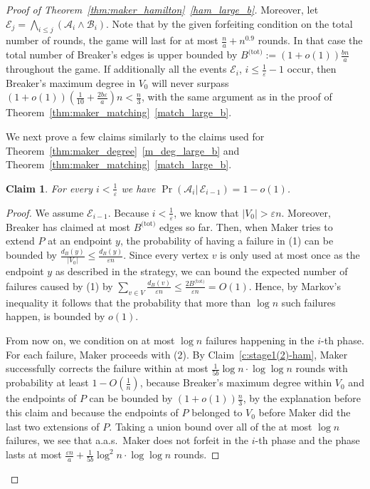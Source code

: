 \documentclass[11pt, a4paper]{article}
\numberwithin{equation}{section}
\numberwithin{figure}{section}
\newtheorem{claim}[theorem]{Claim}
\newcommand{\eps}{\varepsilon}
\begin{document}
\begin{proof}[Proof of Theorem~\ref{thm:maker_hamilton}~\ref{ham_large_b}]
Moreover, let $\mathcal{E}_j = \bigwedge_{i \leq j} (\mathcal{A}_i \land \mathcal{B}_i)$. Note that 
by the given forfeiting condition on the total 
number of rounds, the game will last for at most $\frac{n}{a}+n^{0.9}$ rounds. In that case the total number of Breaker's edges is upper bounded by $B^{\text{(tot)}}:=(1+o(1)) \frac{bn}{a}$ throughout the game.
If additionally all the events $\mathcal{E}_i$, $i \leq \frac{1}{\eps}-1$ occur, then Breaker's maximum degree in $V_0$ will never surpass $(1+o(1))(\frac{1}{10} + \frac{2b\eps}{a}) n < \frac{n}{3}$,
with the same argument as in the proof
of Theorem~\ref{thm:maker_matching}~\ref{match_large_b}.

We next prove a few claims similarly to the claims used for Theorem~\ref{thm:maker_degree}~\ref{m_deg_large_b}
and Theorem~\ref{thm:maker_matching}~\ref{match_large_b}.

\begin{claim} \label{c:prob-ai-ham}
For every $i<\frac{1}{\eps}$ we have $\operatorname{Pr}(\mathcal{A}_i|\, \mathcal{E}_{i-1}) = 1-o(1)$.
\end{claim}

\begin{proof}
We assume $\mathcal{E}_{i-1}$. Because 
$i < \frac{1}{\eps}$, we know that $|V_0| > \eps n$. Moreover, Breaker has claimed at most $B^{\text{(tot)}}$ edges so far. Then, when Maker tries to extend $P$ at an endpoint $y$, the probability of having a failure in (1) can be bounded by $\frac{d_B(y)}{|V_0|} \leq \frac{d_B(y)}{\eps n}$. Since every vertex $v$ is only used at most once as the endpoint $y$ as described in the strategy, we can bound the expected number of failures caused by (1) by $\sum_{v \in V} \frac{d_B(v)}{\eps n} \leq \frac{2 B^{\text{(tot)}}}{\eps n} = O(1)$. Hence,
by Markov's inequality it follows that the probability that more than $\log n$ such failures happen, is bounded by $o(1)$. 

From now on, we condition on at most $\log n$ failures happening in the $i$-th phase.
For each failure, Maker proceeds with (2). 
By Claim~\ref{c:stage1(2)-ham}, Maker successfully corrects the failure within at most $\frac{1}{5b}\log n\cdot \log\log n$ rounds with probability at least $1 - O(\frac{1}{n})$, because Breaker's maximum degree within $V_0$ and the endpoints of $P$ can be bounded by $(1+o(1))\frac{n}{3}$, by the explanation before this claim and because the endpoints of $P$ belonged to $V_0$ before Maker did the last two extensions of $P$. 
Taking a union bound over all of the at most $\log n$ failures, we see that a.a.s.~Maker does not forfeit in the $i$-th phase and the phase lasts at most $\frac{\eps n}{a} + \frac{1}{5b}\log^2 n \cdot \log\log n$ rounds.
\end{proof}


\end{proof}
\end{document}
